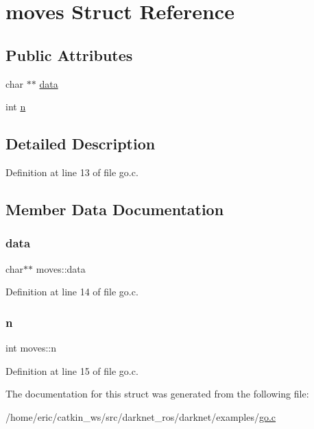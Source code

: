 \hypertarget{structmoves}{}\section{moves Struct Reference}
\label{structmoves}
\subsection*{Public Attributes}
\begin{DoxyCompactItemize}
\item 
char $\ast$$\ast$ \mbox{\hyperlink{structmoves_ac078836de92eeac5dda2fb83ae0b0f2f}{data}}
\item 
int \mbox{\hyperlink{structmoves_aa81066b4e56914d3d6fa93fee404e062}{n}}
\end{DoxyCompactItemize}


\subsection{Detailed Description}


Definition at line 13 of file go.\+c.



\subsection{Member Data Documentation}
\mbox{\label{structmoves_ac078836de92eeac5dda2fb83ae0b0f2f}} 
\subsubsection{\texorpdfstring{data}{data}}
{\footnotesize\ttfamily char$\ast$$\ast$ moves\+::data}



Definition at line 14 of file go.\+c.

\mbox{\label{structmoves_aa81066b4e56914d3d6fa93fee404e062}} 
\subsubsection{\texorpdfstring{n}{n}}
{\footnotesize\ttfamily int moves\+::n}



Definition at line 15 of file go.\+c.



The documentation for this struct was generated from the following file\+:\begin{DoxyCompactItemize}
\item 
/home/eric/catkin\+\_\+ws/src/darknet\+\_\+ros/darknet/examples/\mbox{\hyperlink{go_8c}{go.\+c}}\end{DoxyCompactItemize}
